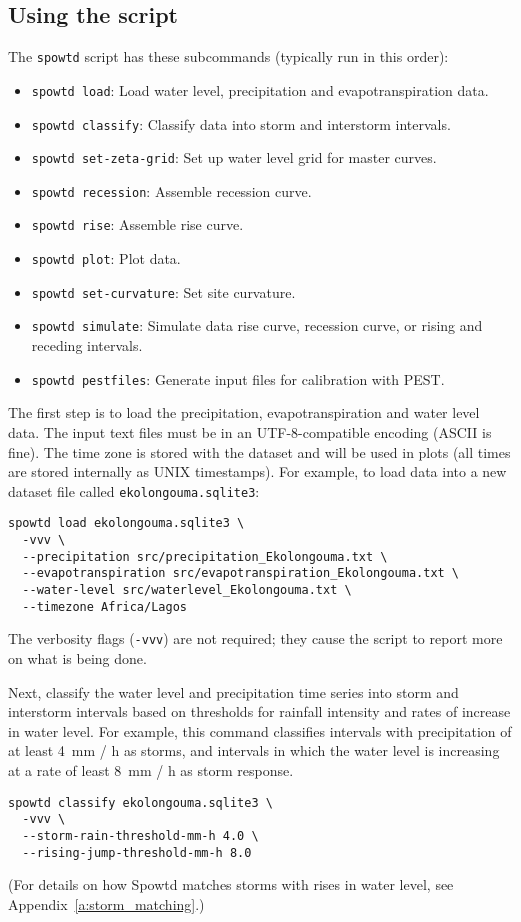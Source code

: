 \documentclass[11pt,a4paper]{article}
\begin{document}
\subsection{Using the script}
The \texttt{spowtd} script has these subcommands (typically run in
this order):
\begin{itemize}
\item \texttt{spowtd load}: Load water level, precipitation and
  evapotranspiration data.
\item \texttt{spowtd classify}: Classify data into storm and
  interstorm intervals.
\item \texttt{spowtd set-zeta-grid}: Set up water level grid for
  master curves.
\item \texttt{spowtd recession}: Assemble recession curve.
\item \texttt{spowtd rise}: Assemble rise curve.
\item \texttt{spowtd plot}: Plot data.
\item \texttt{spowtd set-curvature}: Set site curvature.
\item \texttt{spowtd simulate}: Simulate data rise curve, recession
  curve, or rising and receding intervals.
\item \texttt{spowtd pestfiles}: Generate input files for calibration
  with PEST.
\end{itemize}

The first step is to load the precipitation, evapotranspiration and
water level data.  The input text files must be in an UTF-8-compatible
encoding (ASCII is fine).  The time zone is stored with the dataset
and will be used in plots (all times are stored internally as UNIX
timestamps).  For example, to load data into a new dataset file called
\texttt{ekolongouma.sqlite3}:
\begin{lstlisting}[frame=single]
spowtd load ekolongouma.sqlite3 \
  -vvv \
  --precipitation src/precipitation_Ekolongouma.txt \
  --evapotranspiration src/evapotranspiration_Ekolongouma.txt \
  --water-level src/waterlevel_Ekolongouma.txt \
  --timezone Africa/Lagos
\end{lstlisting}
The verbosity flags (\texttt{-vvv}) are not required; they cause the
script to report more on what is being done.

Next, classify the water level and precipitation time series into
storm and interstorm intervals based on thresholds for rainfall
intensity and rates of increase in water level.  For example, this
command classifies intervals with precipitation of at least 4~mm / h
as storms, and intervals in which the water level is increasing at a
rate of least 8~mm / h as storm response.
\begin{lstlisting}[frame=single]
spowtd classify ekolongouma.sqlite3 \
  -vvv \
  --storm-rain-threshold-mm-h 4.0 \
  --rising-jump-threshold-mm-h 8.0
\end{lstlisting}
(For details on how Spowtd matches storms with rises in water level,
see Appendix~\ref{a:storm_matching}.)
\end{document}
